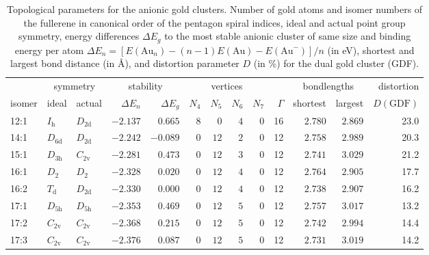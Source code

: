 \begin{table}[htbp]
	\centering
    \setlength{\tabcolsep}{1.5pt}
    \footnotesize{
    \caption{Topological parameters for the anionic gold clusters. Number of
    gold atoms and isomer numbers of the fullerene in canonical order of the
    pentagon spiral indices,\autocite{Fowler-atlas-2006} ideal and actual point
    group symmetry, energy differences $\Delta E_g$ to the most stable anionic
    cluster of same size and binding energy per atom $\Delta E_n =
    [E(\textrm{Au}_n)-(n-1)E(\textrm{Au})-E(\textrm{Au}^-)]/n$  (in eV),
    shortest and largest bond distance (in \AA), and distortion parameter $D$
    (in \%) for the dual gold cluster (GDF). }
	\label{tab:anion}
\begin{tabular}{lllrrrrrrrrrr}
\toprule
\multicolumn{1}{c}{  } & \multicolumn{2}{c}{ symmetry  }  & \multicolumn{2}{c}{stability} & \multicolumn{4}{c}{ vertices } & & \multicolumn{2}{c}{ bondlengths } &  distortion \\
isomer & ideal  & actual  & $\Delta E_n$ &$\Delta E_g$ & \multicolumn{1}{c}{$N_4$} & \multicolumn{1}{c}{$N_5$} & \multicolumn{1}{c}{$N_6$} & \multicolumn{1}{c}{$N_7$}& $\Gamma$ & shortest & largest   & $D(\textrm{GDF})$  \\\midrule
    12:1    & $I_\mathrm{h}$  & $D_\mathrm{2d}$ & $-2.137$ & $0.665$  & $8$ & $0$  & $4$  & $0$ & 16 & $2.780$ & $2.869$ & 23.0  \\
    14:1    & $D_\mathrm{6d}$ & $D_\mathrm{2d}$ & $-2.242$ & $-0.089$ & $0$ & $12$ & $2$  & $0$ & 12 & $2.758$ & $2.989$ & 20.3  \\
    15:1    & $D_\mathrm{3h}$ & $C_\mathrm{2v}$ & $-2.281$ & $0.473$  & $0$ & $12$ & $3$  & $0$ & 12 & $2.741$ & $3.029$ & 21.2  \\
    16:1    & $D_\mathrm{2}$  & $D_\mathrm{2 }$ & $-2.328$ & $0.020$  & $0$ & $12$ & $4$  & $0$ & 12 & $2.764$ & $2.905$ & 17.7  \\
    16:2    & $T_\mathrm{d}$  & $D_\mathrm{2d}$ & $-2.330$ & $0.000$  & $0$ & $12$ & $4$  & $0$ & 12 & $2.738$ & $2.907$ & 16.2  \\
    17:1    & $D_\mathrm{5h}$ & $D_\mathrm{5h}$ & $-2.353$ & $0.469$  & $0$ & $12$ & $5$  & $0$ & 12 & $2.757$ & $3.017$ & 13.2  \\
    17:2    & $C_\mathrm{2v}$ & $C_\mathrm{2v}$ & $-2.368$ & $0.215$  & $0$ & $12$ & $5$  & $0$ & 12 & $2.742$ & $2.994$ & 14.4  \\
    17:3    & $C_\mathrm{2v}$ & $C_\mathrm{2v}$ & $-2.376$ & $0.087$  & $0$ & $12$ & $5$  & $0$ & 12 & $2.731$ & $3.019$ & 14.2  \\

\end{tabular}}
\end{table}
